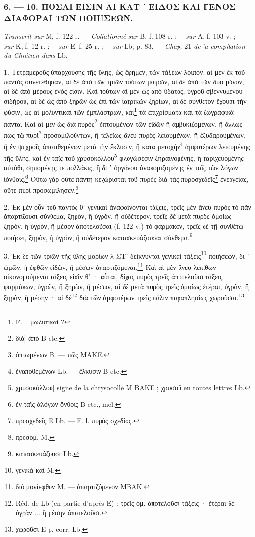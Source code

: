 \documentclass[a4paper, 11pt, oneside, polutonikogreek, french]{article}
\begin{document}
\bigskip
\centerline{\EightStarTaper}
\centerline{\EightStarTaper\EightStarTaper}
\bigskip

\subsubsection{6. --- 10. ΠΟΣΑΙ ΕΙΣΙΝ ΑΙ ΚΑΤ ᾽ ΕΙΔΟΣ ΚΑΙ ΓΕΝΟΣ ΔΙΑΦΟΡΑΙ ΤΩΝ ΠΟΙΗΣΕΩΝ.}

\emph{Transcrit sur} M, f. 122 r. --- \emph{Collationné sur} B, f. 108 r. ;--- \emph{sur} A, f. 103 v. ;--- \emph{sur} K, f. 12 r. ;--- \emph{sur} E, f. 25 r. ;--- \emph{sur} Lb, p. 83. --- \emph{Chap.} 21 \emph{de la compilation du Chrétien dans} Lb.

\bigskip

1. Τετραμεροῦς ὑπαρχούσης τῆς ὕλης, ὡς ἔφημεν, τῶν τάξεων λοιπὸν, αἱ μὲν ἐκ τοῦ παντὸς συνετέθησαν, αἱ δὲ ἀπὸ τῶν τριῶν τούτων μοιρῶν, αἱ δὲ ἀπὸ τῶν δύο μόνον, αἱ δὲ ἀπὸ μέρους ἑνός εἰσιν. Καὶ τούτων αἱ μὲν ὡς ἀπὸ ὕδατος, ὑγροῦ σβεννυμένου σιδήρου, αἱ δὲ ὡς ἀπὸ ξηρῶν ὡς ἐπὶ τῶν ἰατρικῶν ξηρίων, αἱ δὲ σύνθετον ἔχουσι τὴν φύσιν, ὡς αἱ μολυντικαὶ τῶν ἐμπλάστρων, καὶ\footnote{F. l. μωλυτικαὶ ?} τὰ ἐπιχρίσματα καὶ τὰ ζωγραφικὰ πάντα. Καὶ αἱ μὲν ὡς διὰ πυρὸς\footnote{διὰ] ἀπὸ B etc.} ὀπτουμένων τῶν εἰδῶν ἢ ἀμβυκιζομένων, ἢ ἄλλως πως τῷ πυρὶ\footnote{ὀπτωμένων B. --- πῶς MAKE.} προσομιλούντων, ἢ τελείως ἄνευ πυρὸς λειουμένων, ἢ ἐξυδαρουμένων, ἢ ἐν ψυχροῖς ἀποτιθεμένων μετὰ τὴν ἔκλυσιν, ἢ κατὰ μετοχὴν\footnote{ἐναποθεμένων Lb. --- ἕλκυσιν B etc.} ἀμφοτέρων λειουμένης τῆς ὕλης, καὶ ἐν ταῖς τοῦ χρυσοκόλλου\footnote{χρυσοκόλλου] signe de la chrysocolle M BAKE ; χρυσοῦ en toutes lettres Lb.} φλογώσεσιν ξηραινομένης, ἢ ταριχευομένης αὐτόθι, σηπομένης τε πολλάκις, ἢ δι ᾽ ὀργάνου ἀνακομιζομένης ἐν ταῖς τῶν λόγων ἰόνθοις.\footnote{ἐν ταῖς ἀλόγων ὄνθοις B etc., mel.} Οὕτω γὰρ οὔτε πάντη κεχώρισται τοῦ πυρὸς διὰ τὰς πυροσχεδεῖς\footnote{προσχεδεῖς E Lb. --- F. l. πυρὸς σχεδίας.} ἐνεργείας, οὔτε πυρὶ προσωμίλησεν.\footnote{προσομ. M.}

2. Ἐκ μὲν οὖν τοῦ παντὸς θʹ γενικαὶ ἀναφαίνονται τάξεις, τρεῖς μὲν ἄνευ πυρὸς τὸ πᾶν ἀπαρτίζουσι σύνθεμα, ξηρὸν, ἢ ὑγρὸν, ἢ οὐδέτερον, τρεῖς δὲ μετὰ πυρὸς ὁμοίως ξηρὸν, ἢ ὑγρὸν, ἢ μέσον ἀποτελοῦσαι (f. 122 v.) τὸ φάρμακον, τρεῖς δὲ τῇ συνθέτῳ ποιήσει, ξηρὸν, ἢ ὑγρὸν, ἢ οὐδέτερον κατασκευάζουσαι σύνθεμα.\footnote{κατασκευάζουσι Lb.}

3. Ἐκ δὲ τῶν τριῶν τῆς ὕλης μορίων λ ΣΤʹ δείκνυνται γενικαὶ τάξεις\footnote{γενικὰ καὶ M.} ποιήσεων, δι ᾽ ὠμῶν, ἢ ἑφθῶν εἰδῶν, ἢ μέσων ἀπαρτιζόμεναι.\footnote{διὸ μονίεφθον M. --- ἀπαρτιζόμενον MBAK.} Καὶ αἱ μὲν ἄνευ λεκίθων οἰκονομούμεναι τάξεις εἰσὶν θʹ · αὗται, δίχας πυρὸς τρεῖς ἀποτελοῦσι τάξεις φαρμάκων, ὑγρῶν, ἢ ξηρῶν, ἢ μέσων, αἱ δὲ μετὰ πυρὸς τρεῖς ὁμοίως ἑτέραι, ὑγρὰν, ἢ ξηρὰν, ἢ μέσην · αἱ δὲ\footnote{Réd. de Lb (en partie d'après E) : τρεῖς ὁμ. ἀποτελοῦσι τάξεις · ἐτέραι δὲ ὑγρὰν ... ἢ μέσην ἀποτελοῦσι.} διὰ τῶν ἀμφοτέρων τρεῖς πάλιν παραπλησίως χωροῦσαι.\footnote{χωροῦσι E p. corr. Lb.}
\end{document}
